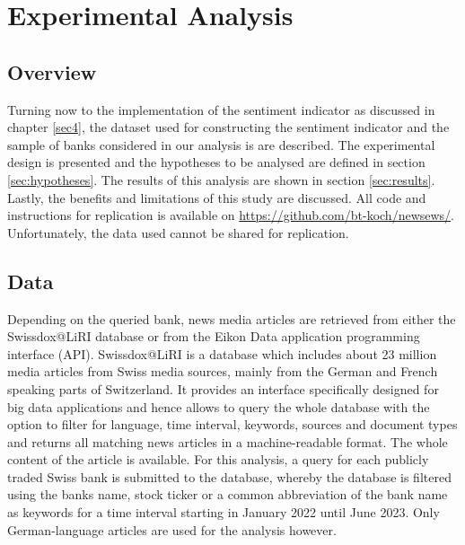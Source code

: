 \chapter{Experimental Analysis}\label{sec5}
\thispagestyle{empty}

\section{Overview}

Turning now to the implementation of the sentiment indicator as discussed in chapter \ref{sec4}, the dataset used for constructing the sentiment indicator and the sample of banks considered in our analysis is are described. The experimental design is presented and the hypotheses to be analysed are defined in section \ref{sec:hypotheses}. The results of this analysis are shown in section \ref{sec:results}. Lastly, the benefits and limitations of this study are discussed. All code and instructions for replication is available on \url{https://github.com/bt-koch/newsews/}. Unfortunately, the data used cannot be shared for replication.

\section{Data}

Depending on the queried bank, news media articles are retrieved from either the Swissdox@LiRI database or from the Eikon Data application programming interface (API). Swissdox@LiRI is a database which includes about 23 million media articles from Swiss media sources, mainly from the German and French speaking parts of Switzerland. It provides an interface specifically designed for big data applications and hence allows to query the whole database with the option to filter for language, time interval, keywords, sources and document types and returns all matching news articles in a machine-readable format. The whole content of the article is available. For this analysis, a query for each publicly traded Swiss bank is submitted to the database, whereby the database is filtered using the banks name, stock ticker or a common abbreviation of the bank name as keywords for a time interval starting in January 2022 until June 2023. Only German-language articles are used for the analysis however. \\


